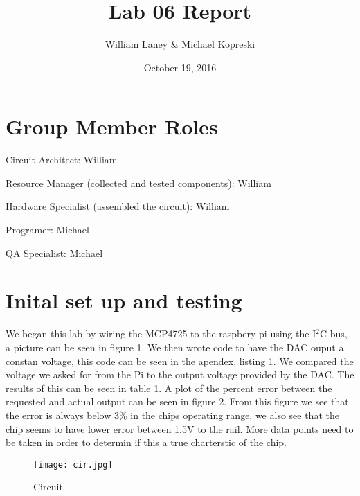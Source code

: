\documentclass[prl,12pt,notitlepage,aps,onecolumn,superscriptaddress]{revtex4-1}
\begin{document}
\title{Lab 06 Report}
\author{William Laney \& Michael Kopreski}
\date{October 19, 2016}
\maketitle

\section{Group Member Roles}
Circuit Architect: William

Resource Manager (collected and tested components): William

Hardware Specialist (assembled the circuit): William

Programer: Michael

QA Specialist: Michael

\section{Inital set up and testing}
We began this lab by wiring the MCP4725 to the raspbery pi using the I$^2$C bus, a picture can be seen in figure 1. We then wrote code to have the DAC ouput a constan voltage, this code can be seen in the apendex, listing 1. We compared the voltage we asked for from the Pi to the output voltage provided by the DAC. The results of this can be seen in table 1. A plot of the percent error between the requested and actual output can be seen in figure 2. From this figure we see that the error is always below 3\% in the chips operating range, we also see that the chip seems to have lower error between 1.5V to the rail. More data points need to be taken in order to determin if this a true charterstic of the chip.

\begin{figure}[h]
\begin{center}
\texttt{[image: cir.jpg]}
\end{center}
\caption{\label{fig:pic} Circuit}
\end{figure}
\end{document}
